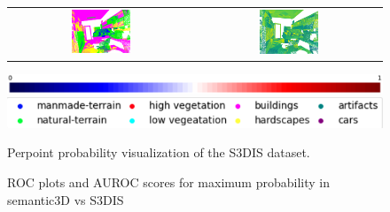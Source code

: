 \begin{figure}[h!]
\begin{tabular}{cc}
            \includegraphics[width=0.33\textwidth, height=0.18\textheight]{images/seg_output/s3dis_DE/S3DIS_4_Pred.png}& 
            \includegraphics[width=0.33\textwidth, height=0.18\textheight]{images/seg_output/s3dis_DE/S3DIS_4_prob.png}\\
        \end{tabular}
        \includegraphics[scale=0.213]{images/color_legend.pdf}
        \includegraphics[scale=0.65]{images/legend.png}
        \caption{Perpoint probability visualization of the S3DIS dataset.}
    \end{figure}

    \begin{figure}[h!]
        \centering
        
        \caption{ROC plots and AUROC scores for maximum probability in semantic3D vs S3DIS}
        \label{fig:AUROC_Prob_Sem3dvs3dis}
    \end{figure}
